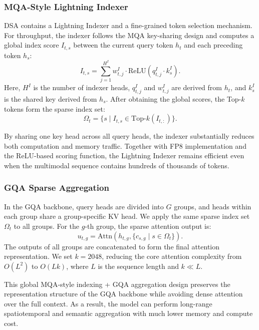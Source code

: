 \documentclass{llmxive}
\begin{document}
\subsubsection{MQA-Style Lightning Indexer}

DSA contains a Lightning Indexer and a fine-grained token selection mechanism. For throughput, the indexer follows the MQA key-sharing design and computes a global index score $I_{t,s}$ between the current query token $h_t$ and each preceding token $h_s$:
\begin{equation}
    I_{t,s} = \sum_{j=1}^{H^{I}} w_{t,j}^{I} \cdot \mathrm{ReLU}(q_{t,j}^{I} \cdot k_{s}^{I}).
\end{equation}
Here, $H^I$ is the number of indexer heads, $q_{t,j}^I$ and $w_{t,j}^I$ are derived from $h_t$, and $k_s^I$ is the shared key derived from $h_s$. After obtaining the global scores, the Top-$k$ tokens form the sparse index set:
\begin{equation}
    \Omega_t = \{s \mid I_{t,s} \in \mathrm{Top}\text{-}k(I_{t,:})\}.
\end{equation}

By sharing one key head across all query heads, the indexer substantially reduces both computation and memory traffic. Together with FP8 implementation and the ReLU-based scoring function, the Lightning Indexer remains efficient even when the multimodal sequence contains hundreds of thousands of tokens.

\subsubsection{GQA Sparse Aggregation}

In the GQA backbone, query heads are divided into $G$ groups, and heads within each group share a group-specific KV head. We apply the same sparse index set $\Omega_t$ to all groups. For the $g$-th group, the sparse attention output is:
\begin{equation}
    u_{t,g} = \mathrm{Attn}(h_{t,g}, \{c_{s,g} \mid s \in \Omega_t\}).
\end{equation}
The outputs of all groups are concatenated to form the final attention representation. We set $k=2048$, reducing the core attention complexity from $O(L^2)$ to $O(Lk)$, where $L$ is the sequence length and $k \ll L$.

This global MQA-style indexing + GQA aggregation design preserves the representation structure of the GQA backbone while avoiding dense attention over the full context. As a result, the model can perform long-range spatiotemporal and semantic aggregation with much lower memory and compute cost.
\end{document}
